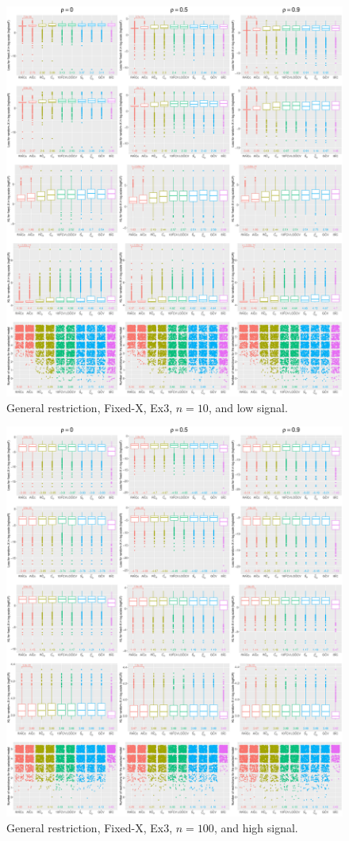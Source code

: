 \clearpage
\begin{figure}[!ht]
\centering
\includegraphics[width=\textwidth]{figures/supplement/fixedx/general_restriction/Ex3_n10_lsnr.eps}
\caption{General restriction, Fixed-X, Ex3, $n=10$, and low signal.}
\end{figure}
\clearpage
\begin{figure}[!ht]
\centering
\includegraphics[width=\textwidth]{figures/supplement/fixedx/general_restriction/Ex3_n100_hsnr.eps}
\caption{General restriction, Fixed-X, Ex3, $n=100$, and high signal.}
\end{figure}
